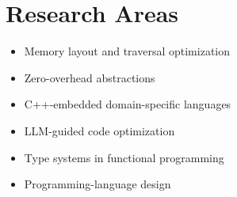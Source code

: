 \section{Research Areas}
{
\begin{itemize}[leftmargin=1.35em,label={\textbf{--}},labelsep=0.5em,topsep=0.2em]
  \item{Memory layout and traversal optimization}
  \item{Zero-overhead abstractions}
  \item{C++-embedded domain-specific languages}
  \item{LLM-guided code optimization}
  \item{Type systems in functional programming}
  \item{Programming-language design}
\end{itemize}
}
